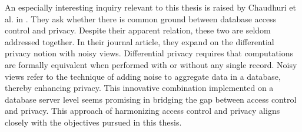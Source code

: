 An especially interesting inquiry relevant to this thesis is raised by Chaudhuri et al. in \cite{chaudhuri2011database}. They ask whether there is common ground between database access control and privacy. Despite their apparent relation, these two are seldom addressed together. In their journal article, they expand on the differential privacy notion with noisy views. Differential privacy requires that computations are formally equivalent when performed with or without any single record. Noisy views refer to the technique of adding noise to aggregate data in a database, thereby enhancing privacy. This innovative combination implemented on a database server level seems promising in bridging the gap between access control and privacy. This approach of harmonizing access control and privacy aligns closely with the objectives pursued in this thesis.



